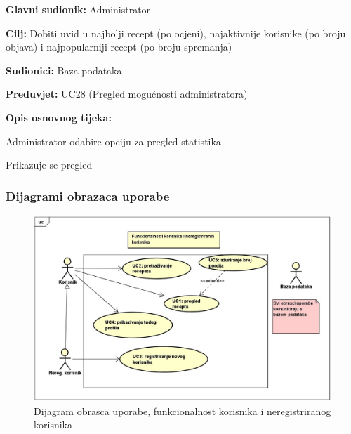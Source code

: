 					\noindent {}
					\begin{packed_item}
						
						\item \textbf{Glavni sudionik: }Administrator
						\item \textbf{Cilj: }Dobiti uvid u najbolji recept (po ocjeni), najaktivnije korisnike (po broju objava) i najpopularniji recept (po broju spremanja)
						\item \textbf{Sudionici: }Baza podataka
						\item \textbf{Preduvjet: }UC28 (Pregled mogućnosti administratora)
						\item \textbf{Opis osnovnog tijeka:}
						
						\item[] \begin{packed_enum}
							\item Administrator odabire opciju za pregled statistika
							\item Prikazuje se pregled
						\end{packed_enum}
					\end{packed_item}
				
					
				\subsubsection{Dijagrami obrazaca uporabe}
					
					\begin{figure}[H]
						\includegraphics[scale=0.4]{slike/UC_nereg.jpeg} %
						\centering
						\caption{Dijagram obrasca uporabe, funkcionalnost korisnika i neregistriranog korisnika}
						\label{fig:UC_diagram1}
					\end{figure}

